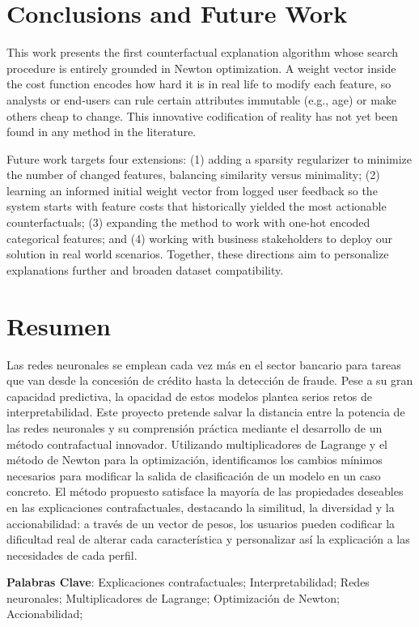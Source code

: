 \documentclass[12pt]{extarticle}
\numberwithin{equation}{section}
\begin{document}
\section*{Conclusions and Future Work}
This work presents the first counterfactual explanation algorithm whose search procedure is entirely grounded in Newton optimization. A weight vector inside the cost function encodes how hard it is in real life to modify each feature, so analysts or end-users can rule certain attributes immutable (e.g., age) or make others cheap to change. This innovative codification of reality has not yet been found in any method in the literature.

Future work targets four extensions: (1) adding a sparsity regularizer to minimize the number of changed features, balancing similarity versus minimality; (2) learning an informed initial weight vector from logged user feedback so the system starts with feature costs that historically yielded the most actionable counterfactuals; (3) expanding the method to work with one-hot encoded categorical features; and (4) working with business stakeholders to deploy our solution in real world scenarios. Together, these directions aim to personalize explanations further and broaden dataset compatibility.



\newpage
\section*{Resumen}
Las redes neuronales se emplean cada vez más en el sector bancario para tareas que van desde la concesión de crédito hasta la detección de fraude. Pese a su gran capacidad predictiva, la opacidad de estos modelos plantea serios retos de interpretabilidad. Este proyecto pretende salvar la distancia entre la potencia de las redes neuronales y su comprensión práctica mediante el desarrollo de un método contrafactual innovador. Utilizando multiplicadores de Lagrange y el método de Newton para la optimización, identificamos los cambios mínimos necesarios para modificar la salida de clasificación de un modelo en un caso concreto. El método propuesto satisface la mayoría de las propiedades deseables en las explicaciones contrafactuales, destacando la similitud, la diversidad y la accionabilidad: a través de un vector de pesos, los usuarios pueden codificar la dificultad real de alterar cada característica y personalizar así la explicación a las necesidades de cada perfil.

\textbf{Palabras Clave}: Explicaciones contrafactuales; Interpretabilidad; Redes neuronales; Multiplicadores de Lagrange; Optimización de Newton; Accionabilidad;
\end{document}
